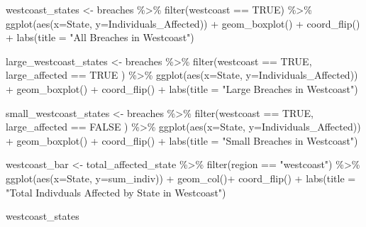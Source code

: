 \documentclass[
]{article}
\newenvironment{Shaded}{\begin{snugshade}}{\end{snugshade}}
\newcommand{\AttributeTok}[1]{\textcolor[rgb]{0.77,0.63,0.00}{#1}}
\newcommand{\ConstantTok}[1]{\textcolor[rgb]{0.00,0.00,0.00}{#1}}
\newcommand{\FunctionTok}[1]{\textcolor[rgb]{0.00,0.00,0.00}{#1}}
\newcommand{\NormalTok}[1]{#1}
\newcommand{\OtherTok}[1]{\textcolor[rgb]{0.56,0.35,0.01}{#1}}
\newcommand{\SpecialCharTok}[1]{\textcolor[rgb]{0.00,0.00,0.00}{#1}}
\newcommand{\StringTok}[1]{\textcolor[rgb]{0.31,0.60,0.02}{#1}}
\begin{document}
\begin{Shaded}
\begin{Highlighting}[]
\NormalTok{westcoast\_states }\OtherTok{\textless{}{-}}\NormalTok{ breaches }\SpecialCharTok{\%\textgreater{}\%}
  \FunctionTok{filter}\NormalTok{(westcoast }\SpecialCharTok{==} \ConstantTok{TRUE}\NormalTok{) }\SpecialCharTok{\%\textgreater{}\%}
  \FunctionTok{ggplot}\NormalTok{(}\FunctionTok{aes}\NormalTok{(}\AttributeTok{x=}\NormalTok{State, }\AttributeTok{y=}\NormalTok{Individuals\_Affected)) }\SpecialCharTok{+}
  \FunctionTok{geom\_boxplot}\NormalTok{() }\SpecialCharTok{+} 
  \FunctionTok{coord\_flip}\NormalTok{() }\SpecialCharTok{+}
  \FunctionTok{labs}\NormalTok{(}\AttributeTok{title =} \StringTok{"All Breaches in Westcoast"}\NormalTok{)}

\NormalTok{large\_westcoast\_states }\OtherTok{\textless{}{-}}\NormalTok{ breaches }\SpecialCharTok{\%\textgreater{}\%}
  \FunctionTok{filter}\NormalTok{(westcoast }\SpecialCharTok{==} \ConstantTok{TRUE}\NormalTok{, large\_affected }\SpecialCharTok{==} \ConstantTok{TRUE}\NormalTok{ ) }\SpecialCharTok{\%\textgreater{}\%}
  \FunctionTok{ggplot}\NormalTok{(}\FunctionTok{aes}\NormalTok{(}\AttributeTok{x=}\NormalTok{State, }\AttributeTok{y=}\NormalTok{Individuals\_Affected)) }\SpecialCharTok{+}
  \FunctionTok{geom\_boxplot}\NormalTok{() }\SpecialCharTok{+} 
  \FunctionTok{coord\_flip}\NormalTok{() }\SpecialCharTok{+}
  \FunctionTok{labs}\NormalTok{(}\AttributeTok{title =} \StringTok{"Large Breaches in Westcoast"}\NormalTok{)}

\NormalTok{small\_westcoast\_states }\OtherTok{\textless{}{-}}\NormalTok{ breaches }\SpecialCharTok{\%\textgreater{}\%}
  \FunctionTok{filter}\NormalTok{(westcoast }\SpecialCharTok{==} \ConstantTok{TRUE}\NormalTok{, large\_affected }\SpecialCharTok{==} \ConstantTok{FALSE}\NormalTok{ ) }\SpecialCharTok{\%\textgreater{}\%}
  \FunctionTok{ggplot}\NormalTok{(}\FunctionTok{aes}\NormalTok{(}\AttributeTok{x=}\NormalTok{State, }\AttributeTok{y=}\NormalTok{Individuals\_Affected)) }\SpecialCharTok{+}
  \FunctionTok{geom\_boxplot}\NormalTok{() }\SpecialCharTok{+} 
  \FunctionTok{coord\_flip}\NormalTok{() }\SpecialCharTok{+}
  \FunctionTok{labs}\NormalTok{(}\AttributeTok{title =} \StringTok{"Small Breaches in Westcoast"}\NormalTok{)}

\NormalTok{westcoast\_bar }\OtherTok{\textless{}{-}}\NormalTok{ total\_affected\_state }\SpecialCharTok{\%\textgreater{}\%}
  \FunctionTok{filter}\NormalTok{(region }\SpecialCharTok{==} \StringTok{"westcoast"}\NormalTok{) }\SpecialCharTok{\%\textgreater{}\%}
  \FunctionTok{ggplot}\NormalTok{(}\FunctionTok{aes}\NormalTok{(}\AttributeTok{x=}\NormalTok{State, }\AttributeTok{y=}\NormalTok{sum\_indiv)) }\SpecialCharTok{+}
  \FunctionTok{geom\_col}\NormalTok{()}\SpecialCharTok{+}
  \FunctionTok{coord\_flip}\NormalTok{() }\SpecialCharTok{+}
  \FunctionTok{labs}\NormalTok{(}\AttributeTok{title =} \StringTok{"Total Indivduals Affected by State in Westcoast"}\NormalTok{)}

\NormalTok{westcoast\_states}
\end{Highlighting}
\end{Shaded}
\end{document}
